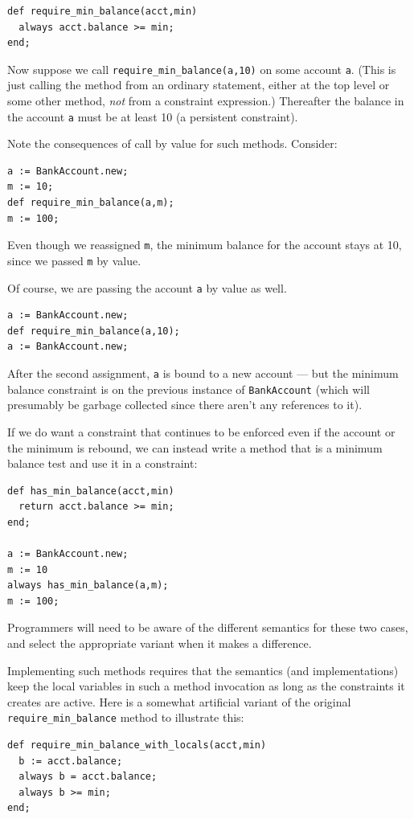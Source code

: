 \documentclass{article}
\begin{document}
\begin{verbatim}
def require_min_balance(acct,min)
  always acct.balance >= min;
end;
\end{verbatim}

Now suppose we call \verb|require_min_balance(a,10)| on some account
\verb|a|.  (This is just calling the method from an ordinary
statement, either at the top level or some other method, \emph{not}
from a constraint expression.)  Thereafter the balance in the account
\verb|a| must be at least 10 (a persistent constraint).

Note the consequences of call by value for such methods.  Consider:
\begin{verbatim}
a := BankAccount.new;
m := 10;
def require_min_balance(a,m);
m := 100;
\end{verbatim}
Even though we reassigned \verb|m|, the minimum balance for the
account stays at 10, since we passed \verb|m| by value.

Of course, we are passing the account \verb|a| by value as well.

\begin{verbatim}
a := BankAccount.new;
def require_min_balance(a,10);
a := BankAccount.new;
\end{verbatim}

After the second assignment,  \verb|a| is bound to a new account --- but
the minimum balance constraint is on the previous instance of
\verb|BankAccount| (which will presumably be garbage collected since
there aren't any references to it).  

If we do want a constraint that continues to be enforced even if the
account or the minimum is rebound, we can instead write a method that
is a minimum balance test and use it in a constraint:

\begin{verbatim}
def has_min_balance(acct,min)
  return acct.balance >= min;
end;

a := BankAccount.new;
m := 10
always has_min_balance(a,m);
m := 100;
\end{verbatim}

Programmers will need to be aware of the different semantics for these
two cases, and select the appropriate variant when it makes a difference.

Implementing such methods requires that the semantics (and
implementations) keep the local variables in such a method invocation
as long as the constraints it creates are active.  Here is a somewhat
artificial variant of the original \verb|require_min_balance|
method to illustrate this:
\begin{verbatim}
def require_min_balance_with_locals(acct,min)
  b := acct.balance;
  always b = acct.balance;
  always b >= min;
end;
\end{verbatim}
\end{document}
